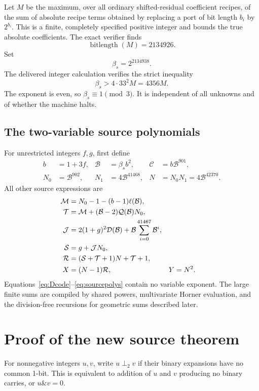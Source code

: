 \documentclass[11pt,letterpaper]{article}
\theoremstyle{definition}\newtheorem{definition}[theorem]{Definition}
\theoremstyle{remark}\newtheorem{remark}[theorem]{Remark}
\newcommand{\cB}{\mathcal B}
\newcommand{\cC}{\mathcal C}
\newcommand{\cD}{\mathcal D}
\newcommand{\cJ}{\mathcal J}
\newcommand{\cM}{\mathcal M}
\newcommand{\cQ}{\mathcal Q}
\newcommand{\cR}{\mathcal R}
\newcommand{\cS}{\mathcal S}
\newcommand{\cT}{\mathcal T}
\begin{document}
Let $M$ be the maximum, over all ordinary shifted-residual coefficient recipes, of the sum of absolute recipe terms obtained by replacing a port of bit length $b_i$ by $2^{b_i}$. This is a finite, completely specified positive integer and bounds the true absolute coefficients. The exact verifier finds
\[
 \operatorname{bitlength}(M)=2134926.
\]
Set
\begin{equation}\label{eq:beta-source}
 \beta_s=2^{2134938}.
\end{equation}
The delivered integer calculation verifies the strict inequality
\begin{equation}\label{eq:radixbound}
 \beta_s>4\cdot33^2M=4356M.
\end{equation}
The exponent is even, so $\beta_s\equiv1\pmod3$. It is independent of all unknowns and of whether the machine halts.

\subsection{The two-variable source polynomials}

For unrestricted integers $f,g$, first define
\begin{align}
 b&=1+3f,&\cB&=\beta_s b^2,&\cC&=b\cB^{901},\label{eq:bbase}\\
 N_0&=\cB^{902},&N_1&=4\cB^{41468},&N&=N_0N_1=4\cB^{42370}.\label{eq:Nsource}
\end{align}
All other source expressions are
\begin{align}
 \cM&=N_0-1-(b-1)\ell(\cB),\notag\\
 \cT&=\cM+(\cB-2)\cQ(\cB)N_0,\notag\\
 \cJ&=2(1+g)^2\cD(\cB)+\cB\sum_{i=0}^{41467}\cB^i,\notag\\
 \cS&=g+\cJ N_0,\notag\\
 \cR&=(\cS+\cT+1)N+\cT+1,\notag\\
 X&=(N-1)\cR,&Y&=N^2.\label{eq:sourcepolys}
\end{align}
Equations~\eqref{eq:Dcode}--\eqref{eq:sourcepolys} contain no variable exponent. The large finite sums are compiled by shared powers, multivariate Horner evaluation, and the division-free recursions for geometric sums described later.

\section{Proof of the new source theorem}\label{sec:sourceproof}

For nonnegative integers $u,v$, write $u\perp_2v$ if their binary expansions have no common 1-bit. This is equivalent to addition of $u$ and $v$ producing no binary carries, or $u\mathbin{\&}v=0$.
\end{document}
